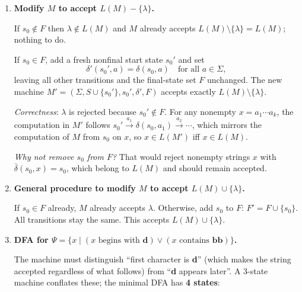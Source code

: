 \documentclass[11pt]{book}
\begin{document}
\begin{enumerate}[{1.}1.]
\item \textbf{Modify $M$ to accept $L(M)-\{\lambda\}$.}

If $s_0 \notin F$ then $\lambda\notin L(M)$ and $M$ already accepts $L(M)\setminus\{\lambda\}=L(M)$; nothing to do.

If $s_0\in F$, add a fresh nonfinal start state $s_0'$ and set
\[
  \delta'(s_0',a)=\delta(s_0,a)\quad\text{for all }a\in\Sigma,
\]
leaving all other transitions and the final-state set $F$ unchanged.
The new machine $M'=(\Sigma,S\cup\{s_0'\},s_0',\delta',F)$ accepts exactly $L(M)\setminus\{\lambda\}$.

\emph{Correctness}: $\lambda$ is rejected because $s_0'\notin F$. For any nonempty $x=a_1\cdots a_k$, the computation in $M'$ follows $s_0'\xrightarrow{a_1}\delta(s_0,a_1)\xrightarrow{a_2}\cdots$, which mirrors the computation of $M$ from $s_0$ on $x$, so $x\in L(M')$ iff $x\in L(M)$.

\emph{Why not remove $s_0$ from $F$?} That would reject nonempty strings $x$ with $\bar\delta(s_0,x)=s_0$, which belong to $L(M)$ and should remain accepted.

\item \textbf{General procedure to modify $M$ to accept $L(M)\cup\{\lambda\}$.}

If $s_0\in F$ already, $M$ already accepts $\lambda$. Otherwise, add $s_0$ to $F$: $F' = F\cup\{s_0\}$. All transitions stay the same. This accepts $L(M)\cup\{\lambda\}$.

\item \textbf{DFA for $\Psi = \{x\mid (x\text{ begins with }\mathbf{d})\vee(x\text{ contains }\mathbf{bb})\}$.}

The machine must distinguish ``first character is \textbf{d}'' (which makes the string accepted regardless of what follows) from ``\textbf{d} appears later''.
A 3-state machine conflates these; the minimal DFA has \textbf{4 states}:


\end{enumerate}
\end{document}
